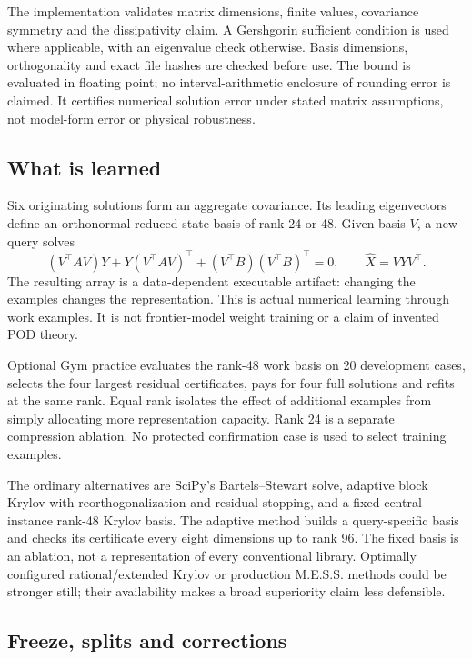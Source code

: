 \documentclass[11pt,letterpaper]{article}
\begin{document}
The implementation validates matrix dimensions, finite values, covariance symmetry and the dissipativity claim. A Gershgorin sufficient condition is used where applicable, with an eigenvalue check otherwise. Basis dimensions, orthogonality and exact file hashes are checked before use. The bound is evaluated in floating point; no interval-arithmetic enclosure of rounding error is claimed. It certifies numerical solution error under stated matrix assumptions, not model-form error or physical robustness.

\subsection{What is learned}

Six originating solutions form an aggregate covariance. Its leading eigenvectors define an orthonormal reduced state basis of rank 24 or 48. Given basis $V$, a new query solves
\begin{equation}
 (V^\top AV)Y+Y(V^\top AV)^\top+(V^\top B)(V^\top B)^\top=0,\qquad \widehat X=VYV^\top.
\end{equation}
The resulting array is a data-dependent executable artifact: changing the examples changes the representation. This is actual numerical learning through work examples. It is not frontier-model weight training or a claim of invented POD theory.

Optional Gym practice evaluates the rank-48 work basis on 20 development cases, selects the four largest residual certificates, pays for four full solutions and refits at the same rank. Equal rank isolates the effect of additional examples from simply allocating more representation capacity. Rank 24 is a separate compression ablation. No protected confirmation case is used to select training examples.

The ordinary alternatives are SciPy's Bartels--Stewart solve, adaptive block Krylov with reorthogonalization and residual stopping, and a fixed central-instance rank-48 Krylov basis. The adaptive method builds a query-specific basis and checks its certificate every eight dimensions up to rank 96. The fixed basis is an ablation, not a representation of every conventional library. Optimally configured rational/extended Krylov or production M.E.S.S. methods could be stronger still; their availability makes a broad superiority claim less defensible.

\subsection{Freeze, splits and corrections}
\end{document}
